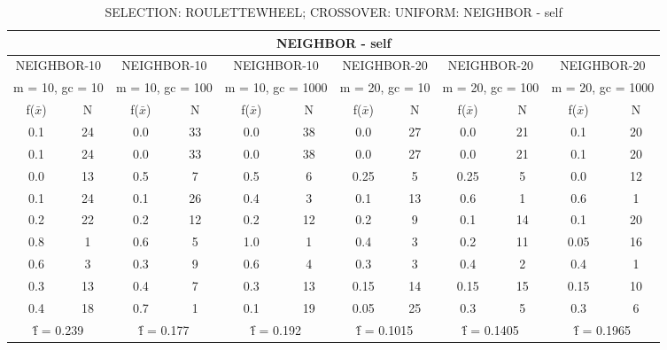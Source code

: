 \begin{table}[H]
	\centering
	\caption{SELECTION: ROULETTEWHEEL; CROSSOVER: UNIFORM: NEIGHBOR - self}
	\begin{adjustbox}{width=1\textwidth}
		\begin{tabular}{ |c|c||c|c||c|c||c|c||c|c||c|c| }
			\hline
			\multicolumn{12}{|c|}{NEIGHBOR - self} \\
			\hline
			\multicolumn{2}{|c||}{NEIGHBOR-10} & \multicolumn{2}{c||}{NEIGHBOR-10} & \multicolumn{2}{c||}{NEIGHBOR-10} & \multicolumn{2}{c||}{NEIGHBOR-20} & \multicolumn{2}{c||}{NEIGHBOR-20} & \multicolumn{2}{c|}{NEIGHBOR-20}\\
			\hline
			\multicolumn{2}{|c||}{m = 10, gc = 10} & \multicolumn{2}{c||}{m = 10, gc = 100} & \multicolumn{2}{c||}{m = 10, gc = 1000} & \multicolumn{2}{c||}{m = 20, gc = 10} & \multicolumn{2}{c||}{m = 20, gc = 100} & \multicolumn{2}{c|}{m = 20, gc = 1000}\\
			\hline
			f($\bar{x}$) & N & f($\bar{x}$) & N & f($\bar{x}$) & N & f($\bar{x}$) & N & f($\bar{x}$) & N & f($\bar{x}$) & N\\
			\hline
			\hline
			0.1 & 24 & 0.0 & 33 & 0.0 & 38 & 0.0 & 27 & 0.0 & 21 & 0.1 & 20\\
			\hline
			0.1 & 24 & 0.0 & 33 & 0.0 & 38 & 0.0 & 27 & 0.0 & 21 & 0.1 & 20\\
			0.0 & 13 & 0.5 & 7 & 0.5 & 6 & 0.25 & 5 & 0.25 & 5 & 0.0 & 12\\
			0.1 & 24 & 0.1 & 26 & 0.4 & 3 & 0.1 & 13 & 0.6 & 1 & 0.6 & 1\\
			0.2 & 22 & 0.2 & 12 & 0.2 & 12 & 0.2 & 9 & 0.1 & 14 & 0.1 & 20\\
			0.8 & 1 & 0.6 & 5 & 1.0 & 1 & 0.4 & 3 & 0.2 & 11 & 0.05 & 16\\
			0.6 & 3 & 0.3 & 9 & 0.6 & 4 & 0.3 & 3 & 0.4 & 2 & 0.4 & 1\\
			0.3 & 13 & 0.4 & 7 & 0.3 & 13 & 0.15 & 14 & 0.15 & 15 & 0.15 & 10\\
			0.4 & 18 & 0.7 & 1 & 0.1 & 19 & 0.05 & 25 & 0.3 & 5 & 0.3 & 6\\
			\hline
			\multicolumn{2}{|c||}{\^{f} = 0.239} & \multicolumn{2}{c||}{\^{f} = 0.177} & \multicolumn{2}{c||}{\^{f} = 0.192} & \multicolumn{2}{c||}{\^{f} = 0.1015} & \multicolumn{2}{c||}{\^{f} = 0.1405} & \multicolumn{2}{c|}{\^{f} = 0.1965}\\
			\hline
		\end{tabular}
	\end{adjustbox}
\end{table}
